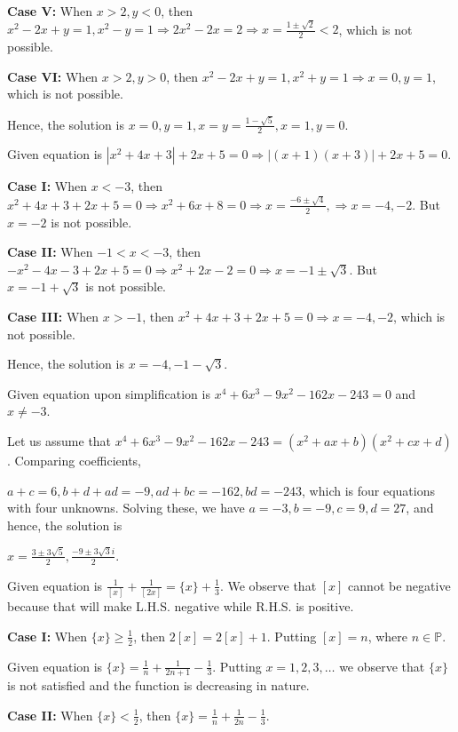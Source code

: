   {\bf Case V:} When $x > 2, y < 0$, then $x^2 - 2x + y = 1, x^2 - y = 1\Rightarrow 2x^2 - 2x = 2
  \Rightarrow x = \frac{1 \pm\sqrt{2}}{2} < 2$, which is not possible.

  {\bf Case VI:} When $x > 2, y > 0$, then $x^2 - 2x + y = 1, x^2 + y = 1\Rightarrow x = 0, y = 1$, which is
  not possible.

  Hence, the solution is $x = 0, y = 1, x = y = \frac{1 -\sqrt{5}}{2}, x = 1, y = 0$.
\item Given equation is $|x^2 + 4x + 3| + 2x + 5 = 0\Rightarrow |(x + 1)(x + 3)| + 2x + 5 = 0$.

  {\bf Case I:} When $x < -3$, then $x^2 + 4x + 3 + 2x + 5 = 0 \Rightarrow x^2 + 6x + 8 = 0 \Rightarrow x =
  \frac{-6\pm\sqrt{4}}{2}, \Rightarrow x = -4, -2$. But $x = -2$ is not possible.

  {\bf Case II:} When $-1 < x < -3$, then $-x^2 - 4x - 3 + 2x + 5 = 0 \Rightarrow x^2 + 2x - 2 = 0
  \Rightarrow x = -1\pm\sqrt{3}$. But $x = -1 + \sqrt{3}$ is not possible.

  {\bf Case III:} When $x > -1$, then $x^2 + 4x + 3 + 2x + 5 = 0 \Rightarrow x = -4, -2$, which is not
  possible.

  Hence, the solution is $x = -4, -1 - \sqrt{3}$.
\item Given equation upon simplification is $x^4 + 6x^3 - 9x^2 - 162x - 243 = 0$ and $x\neq -3$.

  Let us assume that $x^4 + 6x^3 - 9x^2 - 162x - 243 = (x^2 + ax + b)(x^2 + cx + d)$. Comparing
  coefficients,

  $a + c = 6, b + d + ad = -9, ad + bc = -162, bd = -243$, which is four equations with four
  unknowns. Solving these, we have $a = -3, b = -9, c = 9, d = 27$, and hence, the solution is

  $x = \frac{3\pm3\sqrt{5}}{2}, \frac{-9\pm3\sqrt{3}i}{2}$.
\item Given equation is $\frac{1}{[x]} + \frac{1}{[2x]} = \{x\} + \frac{1}{3}$. We observe that $[x]$ cannot
  be negative because that will make L.H.S. negative while R.H.S. is positive.

  {\bf Case I:} When $\{x\}\geq\frac{1}{2}$, then $2[x] = 2[x] + 1$. Putting $[x] = n$, where
  $n\in\mathbb{P}$.

  Given equation is $\{x\} = \frac{1}{n} + \frac{1}{2n + 1} - \frac{1}{3}$. Putting $x = 1, 2, 3, \ldots$
  we observe that $\{x\}$ is not satisfied and the function is decreasing in nature.

  {\bf Case II:} When $\{x\} < \frac{1}{2}$, then $\{x\} = \frac{1}{n} + \frac{1}{2n} - \frac{1}{3}$.

